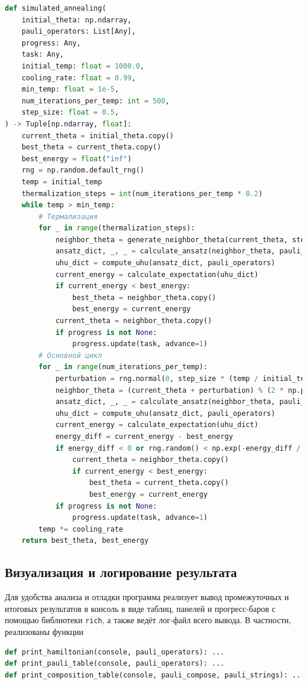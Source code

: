 \documentclass[a4paper]{report}
\begin{document}
\begin{lstlisting}[language=Python]
def simulated_annealing(
    initial_theta: np.ndarray,
    pauli_operators: List[Any],
    progress: Any,
    task: Any,
    initial_temp: float = 1000.0,
    cooling_rate: float = 0.99,
    min_temp: float = 1e-5,
    num_iterations_per_temp: int = 500,
    step_size: float = 0.5,
) -> Tuple[np.ndarray, float]:
    current_theta = initial_theta.copy()
    best_theta = current_theta.copy()
    best_energy = float("inf")
    rng = np.random.default_rng()
    temp = initial_temp
    thermalization_steps = int(num_iterations_per_temp * 0.2)
    while temp > min_temp:
        # Термализация
        for _ in range(thermalization_steps):
            neighbor_theta = generate_neighbor_theta(current_theta, step_size)
            ansatz_dict, _, _ = calculate_ansatz(neighbor_theta, pauli_operators)
            uhu_dict = compute_uhu(ansatz_dict, pauli_operators)
            current_energy = calculate_expectation(uhu_dict)
            if current_energy < best_energy:
                best_theta = neighbor_theta.copy()
                best_energy = current_energy
            current_theta = neighbor_theta.copy()
            if progress is not None:
                progress.update(task, advance=1)
        # Основной цикл
        for _ in range(num_iterations_per_temp):
            perturbation = rng.normal(0, step_size * (temp / initial_temp), current_theta.shape)
            neighbor_theta = (current_theta + perturbation) % (2 * np.pi)
            ansatz_dict, _, _ = calculate_ansatz(neighbor_theta, pauli_operators)
            uhu_dict = compute_uhu(ansatz_dict, pauli_operators)
            current_energy = calculate_expectation(uhu_dict)
            energy_diff = current_energy - best_energy
            if energy_diff < 0 or rng.random() < np.exp(-energy_diff / temp):
                current_theta = neighbor_theta.copy()
                if current_energy < best_energy:
                    best_theta = current_theta.copy()
                    best_energy = current_energy
            if progress is not None:
                progress.update(task, advance=1)
        temp *= cooling_rate
    return best_theta, best_energy
\end{lstlisting}

\subsection{Визуализация и логирование результата}

Для удобства анализа и отладки программа реализует вывод промежуточных и итоговых результатов в консоль в виде таблиц, панелей и прогресс-баров с помощью библиотеки \texttt{rich}, а также ведёт лог-файл всего вывода. В частности, реализованы функции
\begin{lstlisting}[language=Python]
def print_hamiltonian(console, pauli_operators): ...
def print_pauli_table(console, pauli_operators): ...
def print_composition_table(console, pauli_compose, pauli_strings): ...
\end{lstlisting}
\end{document}
